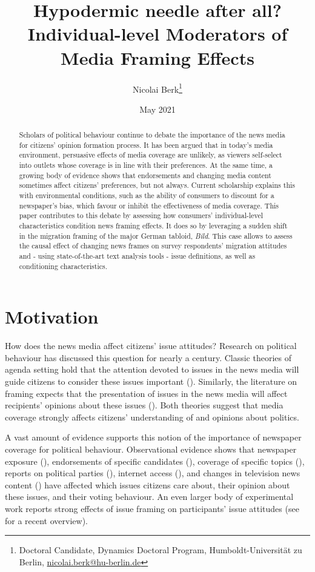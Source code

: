\documentclass{article}
\title{Hypodermic needle after all? Individual-level Moderators of Media Framing Effects}
\author{Nicolai Berk\footnote{Doctoral Candidate, Dynamics Doctoral Program, Humboldt-Universität zu Berlin, \href{mailto:nicolai.berk@hu-berlin.de}{nicolai.berk@hu-berlin.de}}}
\date{May 2021}
\begin{document}
\maketitle


\begin{abstract}
    Scholars of political behaviour continue to debate the importance of the news media for citizens' opinion formation process. It has been argued that in today's media environment, persuasive effects of media coverage are unlikely, as viewers self-select into outlets whose coverage is in line with their preferences. At the same time, a growing body of evidence shows that endorsements and changing media content sometimes affect citizens' preferences, but not always. Current scholarship explains this with environmental conditions, such as the ability of consumers to discount for a newspaper's bias, which favour or inhibit the effectiveness of media coverage. This paper contributes to this debate by assessing how consumers' individual-level characteristics condition news framing effects. It does so by leveraging a sudden shift in the migration framing of the major German tabloid, \textit{Bild}. This case allows to assess the causal effect of changing news frames on survey respondents' migration attitudes and - using state-of-the-art text analysis tools - issue definitions, as well as conditioning characteristics.
\end{abstract}



\section{Motivation}


How does the news media affect citizens' issue attitudes? Research on political behaviour has discussed this question for nearly a century. Classic theories of agenda setting hold that the attention devoted to issues in the news media will guide citizens to consider these issues important (\cite{McCombs1972}). Similarly, the literature on framing expects that the presentation of issues in the news media will affect recipients' opinions about these issues (\cite{Nelson1997}). Both theories suggest that media coverage strongly affects citizens' understanding of and opinions about politics.

A vast amount of evidence supports this notion of the importance of newspaper coverage for political behaviour. Observational evidence shows that newspaper exposure (\cite{Foos2020, Spirig2020}), endorsements of specific candidates (\cite{Ladd2009a, Chiang2011a}), coverage of specific topics (\cite{King2017}), reports on political parties (\cite{Boomgaarden2009, Devine2020}), internet access (\cite{Schaub2020}), and changes in television news content (\cite{Durante2012}) have affected which issues citizens care about, their opinion about these issues, and their voting behaviour. An even larger body of experimental work reports strong effects of issue framing on participants' issue attitudes (see \cite{Busby2019} for a recent overview).
\end{document}

